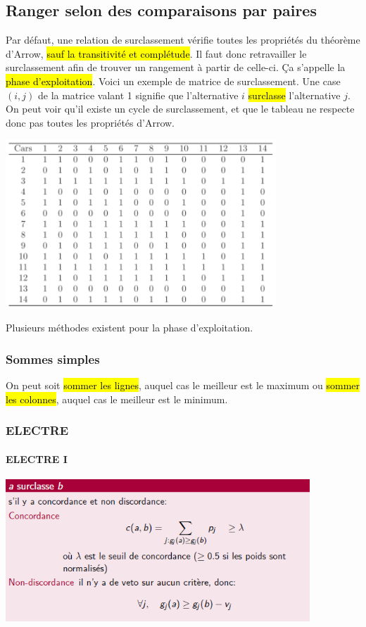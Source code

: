 \documentclass[a4paper, 12pt]{article}
\newcommand{\alinea}{
\hspace*{0.5cm}}
\newcommand{\red}[1]{
	\textcolor{red}{#1}}
\begin{document}
	\subsection{Ranger selon des comparaisons par paires}
		\alinea Par défaut, une relation de surclassement vérifie toutes les propriétés du théorème d'Arrow, \hl{sauf la 
			transitivité et complétude}. Il faut donc retravailler le surclassement afin de trouver un rangement à partir
			de celle-ci. \c Ca s'appelle la \red{\hl{phase d'exploitation}}. Voici un exemple de matrice de surclassement.
			Une case $(i, j)$ de la matrice valant 1 signifie que l'alternative $i$ \hl{surclasse} l'alternative $j$.
			On peut voir qu'il existe un cycle de surclassement, et que le tableau ne respecte donc pas toutes les propriétés
			d'Arrow.
		\begin{center}
			\includegraphics[width=4in]{Images/surclassement2}
		\end{center}	
		\alinea Plusieurs méthodes existent pour la phase d'exploitation.
		\subsubsection{Sommes simples}
			\alinea On peut soit \hl{sommer les lignes}, auquel cas le meilleur est le maximum ou \hl{sommer les colonnes}, auquel cas
				le meilleur est le minimum.
		\subsubsection{ELECTRE}
			\paragraph{ELECTRE I}
				\begin{center}
					\includegraphics[width=4.5in]{Images/electre_1}
				\end{center}
\end{document}
